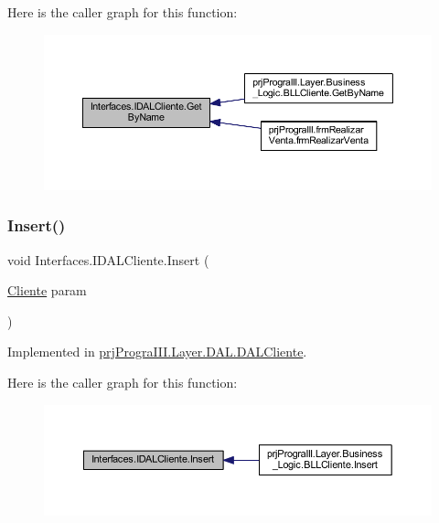 Here is the caller graph for this function\+:
\nopagebreak
\begin{figure}[H]
\begin{center}
\leavevmode
\includegraphics[width=350pt]{interface_interfaces_1_1_i_d_a_l_cliente_a11ca3e48a2e757780fd59a2bd85e522f_icgraph}
\end{center}
\end{figure}
\hypertarget{interface_interfaces_1_1_i_d_a_l_cliente_a40bcf21f1dc9f878612b974300076d6c}{}\label{interface_interfaces_1_1_i_d_a_l_cliente_a40bcf21f1dc9f878612b974300076d6c} 
\subsubsection{\texorpdfstring{Insert()}{Insert()}}
{\footnotesize\ttfamily void Interfaces.\+I\+D\+A\+L\+Cliente.\+Insert (\begin{DoxyParamCaption}\item[{\hyperlink{classprj_progra_i_i_i_1_1_layer_1_1_entities_1_1_cliente}{Cliente}}]{param }\end{DoxyParamCaption})}



Implemented in \hyperlink{classprj_progra_i_i_i_1_1_layer_1_1_d_a_l_1_1_d_a_l_cliente_ab9646dc3260db65cb7baf86ed33e3d70}{prj\+Progra\+I\+I\+I.\+Layer.\+D\+A\+L.\+D\+A\+L\+Cliente}.

Here is the caller graph for this function\+:
\nopagebreak
\begin{figure}[H]
\begin{center}
\leavevmode
\includegraphics[width=350pt]{interface_interfaces_1_1_i_d_a_l_cliente_a40bcf21f1dc9f878612b974300076d6c_icgraph}
\end{center}
\end{figure}
\hypertarget{interface_interfaces_1_1_i_d_a_l_cliente_abe4143d07e9223b242e52e3b486f2c33}{}\label{interface_interfaces_1_1_i_d_a_l_cliente_abe4143d07e9223b242e52e3b486f2c33} 
